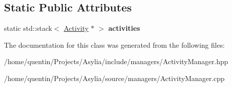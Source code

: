 \subsection*{Static Public Attributes}
\begin{DoxyCompactItemize}
\item 
\hypertarget{classActivityManager_a752d2002bd19e545da154537977aa7d6}{static std\-::stack$<$ \hyperlink{classActivity}{Activity} $\ast$ $>$ {\bfseries activities}}\label{classActivityManager_a752d2002bd19e545da154537977aa7d6}

\end{DoxyCompactItemize}


The documentation for this class was generated from the following files\-:\begin{DoxyCompactItemize}
\item 
/home/quentin/\-Projects/\-Asylia/include/managers/Activity\-Manager.\-hpp\item 
/home/quentin/\-Projects/\-Asylia/source/managers/Activity\-Manager.\-cpp\end{DoxyCompactItemize}
